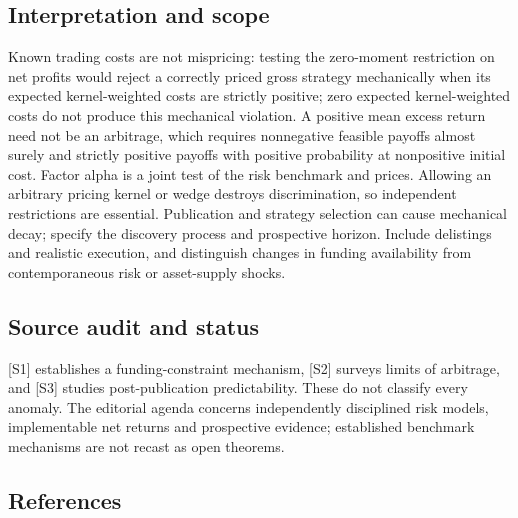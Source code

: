 \documentclass[11pt,a4paper]{article}
\begin{document}
\subsection*{Interpretation and scope}
Known trading costs are not mispricing: testing the zero-moment restriction on net profits would reject a correctly priced gross strategy mechanically when its expected kernel-weighted costs are strictly positive; zero expected kernel-weighted costs do not produce this mechanical violation. A positive mean excess return need not be an arbitrage, which requires nonnegative feasible payoffs almost surely and strictly positive payoffs with positive probability at nonpositive initial cost. Factor alpha is a joint test of the risk benchmark and prices. Allowing an arbitrary pricing kernel or wedge destroys discrimination, so independent restrictions are essential. Publication and strategy selection can cause mechanical decay; specify the discovery process and prospective horizon. Include delistings and realistic execution, and distinguish changes in funding availability from contemporaneous risk or asset-supply shocks.

\subsection*{Source audit and status}
[S1] establishes a funding-constraint mechanism, [S2] surveys limits of arbitrage, and [S3] studies post-publication predictability. These do not classify every anomaly. The editorial agenda concerns independently disciplined risk models, implementable net returns and prospective evidence; established benchmark mechanisms are not recast as open theorems.

\subsection*{References}
\end{document}
